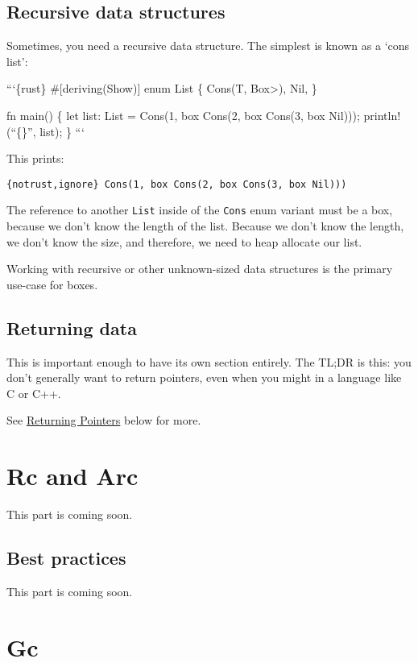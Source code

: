 \documentclass[]{article}
\begin{document}
\subsection{Recursive data structures}\label{recursive-data-structures}

Sometimes, you need a recursive data structure. The simplest is known as
a `cons list':

```\{rust\} \#{[}deriving(Show){]} enum List \{ Cons(T,
Box\textgreater{}), Nil, \}

fn main() \{ let list: List = Cons(1, box Cons(2, box Cons(3, box
Nil))); println!(``\{\}'', list); \} ```

This prints:

\texttt{\{notrust,ignore\} Cons(1, box Cons(2, box Cons(3, box Nil)))}

The reference to another \texttt{List} inside of the \texttt{Cons} enum
variant must be a box, because we don't know the length of the list.
Because we don't know the length, we don't know the size, and therefore,
we need to heap allocate our list.

Working with recursive or other unknown-sized data structures is the
primary use-case for boxes.

\subsection{Returning data}\label{returning-data}

This is important enough to have its own section entirely. The TL;DR is
this: you don't generally want to return pointers, even when you might
in a language like C or C++.

See \hyperref[returning-pointers]{Returning Pointers} below for more.

\section{Rc and Arc}\label{rc-and-arc}

This part is coming soon.

\subsection{Best practices}\label{best-practices-2}

This part is coming soon.

\section{Gc}\label{gc}
\end{document}
